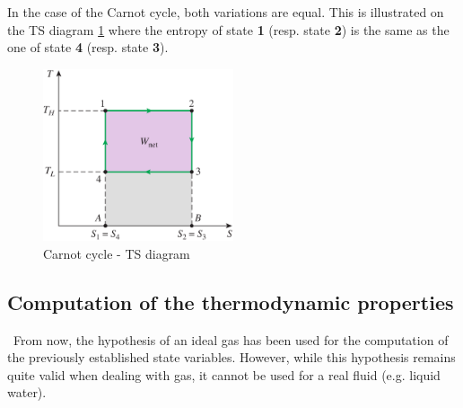 In the case of the Carnot cycle, both variations are equal. This is illustrated on the TS diagram \ref{fig:C2_CarnotTS} where the entropy of state \textbf{1} (resp. state \textbf{2}) is the same as the one of state \textbf{4} (resp. state \textbf{3}).
\begin{figure}[h]
\centering
\includegraphics[width=0.5\textwidth]{Carnot_TS.png}
\caption{Carnot cycle - TS diagram \cite{2015}}
\label{fig:C2_CarnotTS}
\end{figure}

%


\subsection{Computation of the thermodynamic properties}
\quad\, From now, the hypothesis of an ideal gas has been used for the computation of the previously established state variables. However, while this hypothesis remains quite valid when dealing with gas, it cannot be used for a real fluid (e.g. liquid water).

